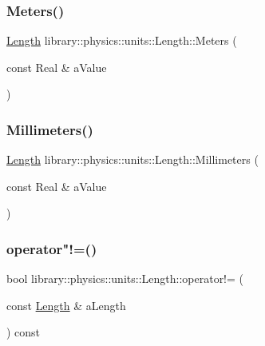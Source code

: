\subsubsection{\texorpdfstring{Meters()}{Meters()}}
{\footnotesize\ttfamily \hyperlink{classlibrary_1_1physics_1_1units_1_1_length}{Length} library\+::physics\+::units\+::\+Length\+::\+Meters (\begin{DoxyParamCaption}\item[{const Real \&}]{a\+Value }\end{DoxyParamCaption})\hspace{0.3cm}{\ttfamily [static]}}

\mbox{\label{classlibrary_1_1physics_1_1units_1_1_length_a291b337e409be3e9a13fa697867eb5c8}} 
\subsubsection{\texorpdfstring{Millimeters()}{Millimeters()}}
{\footnotesize\ttfamily \hyperlink{classlibrary_1_1physics_1_1units_1_1_length}{Length} library\+::physics\+::units\+::\+Length\+::\+Millimeters (\begin{DoxyParamCaption}\item[{const Real \&}]{a\+Value }\end{DoxyParamCaption})\hspace{0.3cm}{\ttfamily [static]}}

\mbox{\label{classlibrary_1_1physics_1_1units_1_1_length_ac2c8c35dcfe12ef8950f99f38d923549}} 
\subsubsection{\texorpdfstring{operator"!=()}{operator!=()}}
{\footnotesize\ttfamily bool library\+::physics\+::units\+::\+Length\+::operator!= (\begin{DoxyParamCaption}\item[{const \hyperlink{classlibrary_1_1physics_1_1units_1_1_length}{Length} \&}]{a\+Length }\end{DoxyParamCaption}) const}

